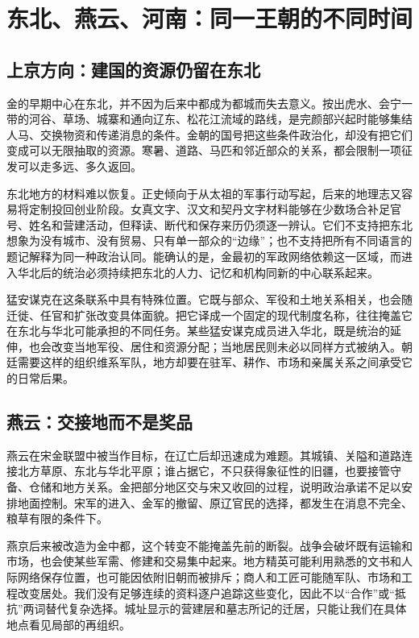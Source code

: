 \section{东北、燕云、河南：同一王朝的不同时间}

\subsection{上京方向：建国的资源仍留在东北}

金的早期中心在东北，并不因为后来中都成为都城而失去意义。按出虎水、会宁一带的河谷、草场、城寨和通向辽东、松花江流域的路线，是完颜部兴起时能够集结人马、交换物资和传递消息的条件。金朝的国号把这些条件政治化，却没有把它们变成可以无限抽取的资源。寒暑、道路、马匹和邻近部众的关系，都会限制一项征发可以走多远、多久返回。

东北地方的材料难以恢复。正史倾向于从太祖的军事行动写起，后来的地理志又容易将定制投回创业阶段。女真文字、汉文和契丹文字材料能够在少数场合补足官号、姓名和营建活动，但释读、断代和保存来历仍须逐一辨认。它们不支持把东北想象为没有城市、没有贸易、只有单一部众的“边缘”；也不支持把所有不同语言的题记解释为同一种政治认同。能确认的是，金最初的军政网络依赖这一区域，而进入华北后的统治必须持续把东北的人力、记忆和机构同新的中心联系起来。

猛安谋克在这条联系中具有特殊位置。它既与部众、军役和土地关系相关，也会随迁徙、任官和扩张改变具体面貌。把它译成一个固定的现代制度名称，往往掩盖它在东北与华北可能承担的不同任务。某些猛安谋克成员进入华北，既是统治的延伸，也会改变当地军役、居住和资源分配；当地居民则未必以同样方式被纳入。朝廷需要这样的组织维系军队，地方却要在驻军、耕作、市场和亲属关系之间承受它的日常后果。

\subsection{燕云：交接地而不是奖品}

燕云在宋金联盟中被当作目标，在辽亡后却迅速成为难题。其城镇、关隘和道路连接北方草原、东北与华北平原；谁占据它，不只获得象征性的旧疆，也要接管守备、仓储和地方关系。金把部分地区交与宋又收回的过程，说明政治承诺不足以安排地面控制。宋军的进入、金军的撤留、原辽官民的选择，都发生在消息不完全、粮草有限的条件下。

燕京后来被改造为金中都，这个转变不能掩盖先前的断裂。战争会破坏既有运输和市场，也会使某些军需、修建和交易集中起来。地方精英可能利用熟悉的文书和人际网络保存位置，也可能因依附旧朝而被排斥；商人和工匠可能随军队、市场和工程改变居处。我们没有足够连续的资料逐户追踪这些变化，因此不以“合作”或“抵抗”两词替代复杂选择。城址显示的营建层和墓志所记的迁居，只能让我们在具体地点看见局部的再组织。

